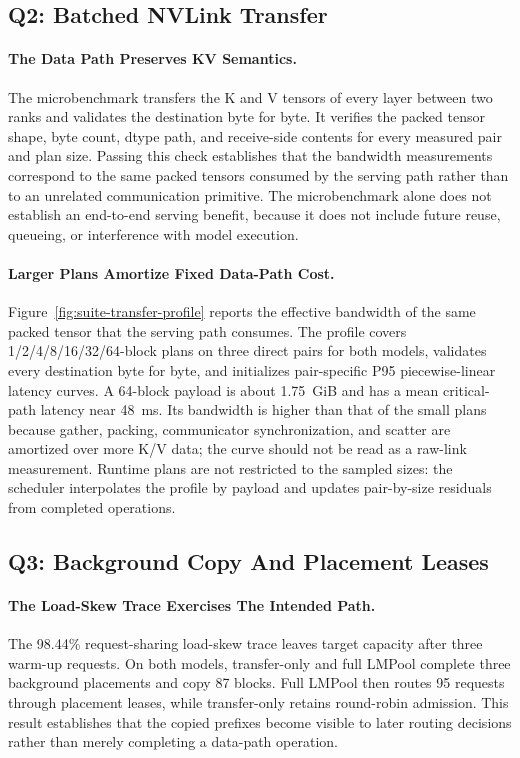 \documentclass{article}
\newcommand{\sys}{LMPool}
\begin{document}
\subsection{Q2: Batched NVLink Transfer}

\paragraph{The Data Path Preserves KV Semantics.} The microbenchmark transfers the K and V tensors of every layer between two ranks and validates the destination byte for byte. It verifies the packed tensor shape, byte count, dtype path, and receive-side contents for every measured pair and plan size. Passing this check establishes that the bandwidth measurements correspond to the same packed tensors consumed by the serving path rather than to an unrelated communication primitive. The microbenchmark alone does not establish an end-to-end serving benefit, because it does not include future reuse, queueing, or interference with model execution.

\paragraph{Larger Plans Amortize Fixed Data-Path Cost.} Figure~\ref{fig:suite-transfer-profile} reports the effective bandwidth of the same packed tensor that the serving path consumes. The profile covers 1/2/4/8/16/32/64-block plans on three direct pairs for both models, validates every destination byte for byte, and initializes pair-specific P95 piecewise-linear latency curves. A 64-block payload is about 1.75~GiB and has a mean critical-path latency near 48~ms. Its bandwidth is higher than that of the small plans because gather, packing, communicator synchronization, and scatter are amortized over more K/V data; the curve should not be read as a raw-link measurement. Runtime plans are not restricted to the sampled sizes: the scheduler interpolates the profile by payload and updates pair-by-size residuals from completed operations.

\subsection{Q3: Background Copy And Placement Leases}

\paragraph{The Load-Skew Trace Exercises The Intended Path.} The 98.44\% request-sharing load-skew trace leaves target capacity after three warm-up requests. On both models, transfer-only and full \sys{} complete three background placements and copy 87 blocks. Full \sys{} then routes 95 requests through placement leases, while transfer-only retains round-robin admission. This result establishes that the copied prefixes become visible to later routing decisions rather than merely completing a data-path operation.
\end{document}

